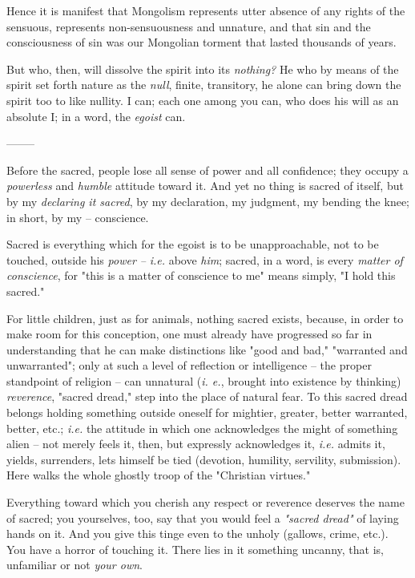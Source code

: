 \documentclass[a4paper]{book}
\begin{document}
Hence it is manifest that Mongolism represents utter absence of any rights of 
the sensuous, represents non-sensuousness and unnature, and that sin and the 
consciousness of sin was our Mongolian torment that lasted thousands of years.

But who, then, will dissolve the spirit into its \textit{nothing?} He who by 
means of the spirit set forth nature as the \textit{null}, finite, transitory, 
he alone can bring down the spirit too to like nullity. I can; each one among 
you can, who does his will as an absolute I; in a word, the \textit{egoist} 
can.

\begin{center}
--------\end{center}


Before the sacred, people lose all sense of power and all confidence; they 
occupy a \textit{powerless} and \textit{humble} attitude toward it. And yet no 
thing is sacred of itself, but by my \textit{declaring it sacred}, by my 
declaration, my judgment, my bending the knee; in short, by my -- conscience.

Sacred is everything which for the egoist is to be unapproachable, not to be 
touched, outside his \textit{power --} \textit{i.e.} above \textit{him}; 
sacred, in a word, is every \textit{matter of conscience}, for "{}this is a 
matter of conscience to me"{} means simply, "{}I hold this sacred."{}

For little children, just as for animals, nothing sacred exists, because, in 
order to make room for this conception, one must already have progressed so 
far in understanding that he can make distinctions like "{}good and bad,"{} 
"{}warranted and unwarranted"{}; only at such a level of reflection or 
intelligence -- the proper standpoint of religion -- can unnatural (\textit{i. 
e.}, brought into existence by thinking) \textit{reverence}, "{}sacred 
dread,"{} step into the place of natural fear. To this sacred dread belongs 
holding something outside oneself for mightier, greater, better warranted, 
better, etc.; \textit{i.e.} the attitude in which one acknowledges the might 
of something alien -- not merely feels it, then, but expressly acknowledges 
it, \textit{i.e.} admits it, yields, surrenders, lets himself be tied 
(devotion, humility, servility, submission). Here walks the whole ghostly 
troop of the "{}Christian virtues."{}

Everything toward which you cherish any respect or reverence deserves the name 
of sacred; you yourselves, too, say that you would feel a \textit{"{}sacred 
dread"{}} of laying hands on it. And you give this tinge even to the unholy 
(gallows, crime, etc.). You have a horror of touching it. There lies in it 
something uncanny, that is, unfamiliar or not \textit{your own}.
\end{document}
